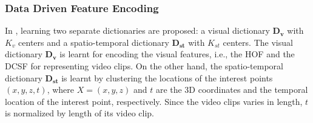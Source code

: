 \documentclass[a4paper, 10pt, conference]{ieeeconf}      %
\begin{document}
\subsubsection{Data Driven Feature Encoding}
\label{section:DataDrivenFeatureEncoding}


	In \cite{c1}, learning two separate dictionaries are proposed: a visual dictionary $\mathbf{D_{v}}$ with $K_{v}$ centers and a spatio-temporal dictionary $\mathbf{D_{st}}$ with $K_{st}$ centers. The visual dictionary $\mathbf{D_{v}}$ is learnt for encoding the visual features, i.e., the HOF and the DCSF for representing video clips. On the other hand, the spatio-temporal dictionary $\mathbf{D_{st}}$ is learnt by clustering the locations of the interest points $\left(x,y,z,t\right)$, where $X=\left(x,y,z\right)$
and $t$ are the 3D coordinates and the temporal location
of the interest point, respectively. Since the video clips varies in length, $t$ is normalized by length of its video clip. 


\end{document}
